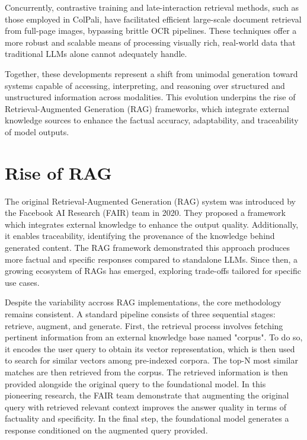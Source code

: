 \documentclass[12pt,twoside]{report}
\begin{document}
Concurrently, contrastive training and late-interaction retrieval methods, such as those employed in ColPali, have facilitated efficient large-scale document retrieval from full-page images, bypassing brittle OCR pipelines. These techniques offer a more robust and scalable means of processing visually rich, real-world data that traditional LLMs alone cannot adequately handle.

Together, these developments represent a shift from unimodal generation toward systems capable of accessing, interpreting, and reasoning over structured and unstructured information across modalities. This evolution underpins the rise of Retrieval-Augmented Generation (RAG) frameworks, which integrate external knowledge sources to enhance the factual accuracy, adaptability, and traceability of model outputs.

\section{Rise of RAG}
The original Retrieval-Augmented Generation (RAG) system was introduced by the Facebook AI Research (FAIR) team in 2020\cite{FAIRRAG}. They proposed a framework which integrates external knowledge to enhance the output quality. Additionally, it enables traceability, identifying the provenance of the knowledge behind generated content. The RAG framework demonstrated this approach produces more factual and specific responses compared to standalone LLMs. Since then, a growing ecosystem of RAGs has emerged\cite{RAGSurvey}, exploring trade-offs tailored for specific use cases.

Despite the variability accross RAG implementations, the core methodology remains consistent. A standard pipeline consists of three sequential stages: retrieve, augment, and generate. First, the retrieval process involves fetching pertinent information from an external knowledge base named "corpus". To do so, it encodes the user query to obtain its vector representation, which is then used to search for similar vectors among pre-indexed corpora. The top-N most similar matches are then retrieved from the corpus. The retrieved information is then provided alongside the original query to the foundational model. In this pioneering research, the FAIR team demonstrate that augmenting the original query with retrieved relevant context improves the answer quality in terms of factuality and specificity. In the final step, the foundational model generates a response conditioned on the augmented query provided.
\end{document}
